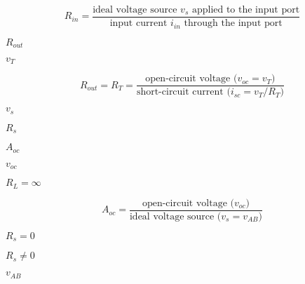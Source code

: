 {\newpage\clearpage
{}%
\begin{displaymath} R_{in}=\frac{\mbox{ideal voltage source $v_s$\  applied to the input port}}{\mbox{input current $i_{in}$\  through the input port}} \end{displaymath}%
\lthtmldisplayZ
\lthtmlcheckvsize\clearpage}

{\newpage\clearpage
{}%
$R_{out}$%
\lthtmlinlinemathZ
\lthtmlcheckvsize\clearpage}

{\newpage\clearpage
{}%
$v_T$%
\lthtmlinlinemathZ
\lthtmlcheckvsize\clearpage}

{\newpage\clearpage
{}%
\begin{displaymath} R_{out}=R_T=\frac{\mbox{open-circuit voltage ($v_{oc}=v_T$)}}{\mbox{short-circuit current ($i_{sc}=v_T/R_T$)}} \end{displaymath}%
\lthtmldisplayZ
\lthtmlcheckvsize\clearpage}

{\newpage\clearpage
{}%
$v_s$%
\lthtmlinlinemathZ
\lthtmlcheckvsize\clearpage}

{\newpage\clearpage
{}%
$R_s$%
\lthtmlinlinemathZ
\lthtmlcheckvsize\clearpage}

{\newpage\clearpage
{}%
$A_{oc}$%
\lthtmlinlinemathZ
\lthtmlcheckvsize\clearpage}

{\newpage\clearpage
{}%
$v_{oc}$%
\lthtmlinlinemathZ
\lthtmlcheckvsize\clearpage}

{\newpage\clearpage
{}%
$R_L=\infty$%
\lthtmlinlinemathZ
\lthtmlcheckvsize\clearpage}

{\newpage\clearpage
{}%
\begin{displaymath} A_{oc}=\frac{\mbox{open-circuit voltage ($v_{oc}$)}}{\mbox{ideal voltage source ($v_s=v_{AB}$)}}\end{displaymath}%
\lthtmldisplayZ
\lthtmlcheckvsize\clearpage}

{\newpage\clearpage
{}%
$R_s=0$%
\lthtmlinlinemathZ
\lthtmlcheckvsize\clearpage}

{\newpage\clearpage
{}%
$R_s\ne 0$%
\lthtmlinlinemathZ
\lthtmlcheckvsize\clearpage}

{\newpage\clearpage
{}%
$v_{AB}$%
\lthtmlinlinemathZ
\lthtmlcheckvsize\clearpage}

